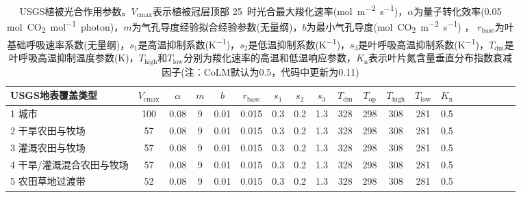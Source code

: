 \begin{landscape}
  \begin{table}[htbp]
    \centering
    \caption[USGS植被光合作用参数]{USGS植被光合作用参数。$V_{\mathrm{cmax}}$表示植被冠层顶部 25~\textcelsius 时光合最大羧化速率(\unit{mol.m^{-2}.s^{-1}})，$\alpha$为量子转化效率(0.05 \unit{mol.CO_2.mol^{-1}.photon})，$m$为气孔导度经验拟合经验参数(无量纲)，$b$为最小气孔导度(\unit{mol.CO_2.m^{-2}.s^{-1}}) ，
    $r_{\mathrm{base}}$为叶基础呼吸速率系数(无量纲)，$s_1$是高温抑制系数(\unit{K^{-1}})，$s_2$是低温抑制系数(\unit{K^{-1}})，$s_3$是叶呼吸高温抑制系数(\unit{K^{-1}})，$T_{\mathrm{dm}}$是叶呼吸高温抑制温度参数(K)，$T_{\mathrm{high}}$和$T_{\mathrm{low}}$分别为羧化速率的高温和低温响应参数，$K_{\mathrm {n}} $表示叶片氮含量垂直分布指数衰减因子(注：CoLM默认为0.5，代码中更新为0.11)}
    \label{tab:USGS植被光合作用参数1}
    \begin{tabular}{@{}lccccccccccccccccccc@{}}
      \toprule
      USGS地表覆盖类型          & $ V_{\mathrm{cmax}}$ & $\alpha$ & $m$ & $b$  & $r_{\mathrm{base}}$ & $s_1$ & $s_2$ & $s_3$ & $T_{\mathrm{dm}}$ & $T_{\mathrm{op}}$ & $T_{\mathrm{high}}$ & $T_{\mathrm{low}}$ & $K_{\mathrm {n}} $ \\ \midrule
      1 城市                    & 100                  & 0.08     & 9   & 0.01 & 0.015               & 0.3   & 0.2   & 1.3   & 328               & 298               & 308                 & 281                & 0.5                \\
      2 干旱农田与牧场          & 57                   & 0.08     & 9   & 0.01 & 0.015               & 0.3   & 0.2   & 1.3   & 328               & 298               & 308                 & 281                & 0.5                \\
      3 灌溉农田与牧场          & 57                   & 0.08     & 9   & 0.01 & 0.015               & 0.3   & 0.2   & 1.3   & 328               & 298               & 308                 & 281                & 0.5                \\
      4 干旱/灌溉混合农田与牧场 & 57                   & 0.08     & 9   & 0.01 & 0.015               & 0.3   & 0.2   & 1.3   & 328               & 298               & 308                 & 281                & 0.5                \\
      5 农田草地过渡带          & 52                   & 0.08     & 9   & 0.01 & 0.015               & 0.3   & 0.2   & 1.3   & 328               & 298               & 308                 & 281                & 0.5                \\

\end{tabular}
\end{table}
\end{landscape}
